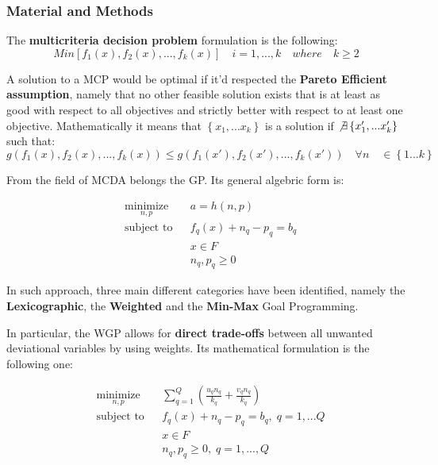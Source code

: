 \documentclass{beamer}
\begin{document}
\begin{frame}[allowframebreaks]
	\frametitle{Material and Methods}
	\justifying
The \textbf{multicriteria decision problem} formulation is the following: 
$$
Min[f_1(x),f_2(x),...,f_k(x)] \quad i=1,...,k \quad where \quad k\geq2
$$
	

A solution to a MCP would be optimal if it'd respected the \textbf{Pareto Efficient assumption}, namely that no other feasible solution exists that is at least as good with respect to all objectives and strictly better with respect to at least one objective. Mathematically it means that $\left\{x_1,...x_k\right\}$ is a solution if $\not\exists \left\{x'_1,...x'_k\right\}$
such that:
$$
	g(f_1(x),f_2(x),...,f_k(x)) \leq g(f_1(x'),f_2(x'),...,f_k(x')) \quad \forall n \quad \in  \left\{1...k\right\}
$$

\pagebreak

From the field of MCDA belongs the GP. Its general algebric form is:

\begin{equation*}
\begin{aligned}
& \underset{n,p}{\text{minimize}}
& & a=h(n,p) \\
& \text{subject to}
& & f_q(x)+n_q-p_q=b_q \\
& & & x\in F \\
& & & n_q,p_q\geq 0 
\end{aligned}
\end{equation*}

In such approach, three main different categories have been identified, namely the \textbf{Lexicographic}, the \textbf{Weighted} and the \textbf{Min-Max} Goal Programming.

\pagebreak

In particular, the WGP allows for \textbf{direct trade-offs} between all unwanted deviational variables by using weights. Its mathematical formulation is the following one:

\begin{equation*}
\begin{aligned}
& \underset{n,p}{\text{minimize}}
& & \sum_{q=1}^{Q}(\frac{u_q n_q}{k_q}+\frac{v_q n_q}{k_q}) \\
& \text{subject to}
& & f_q(x)+n_q-p_q=b_q, \; q=1,...Q \\
& & & x\in F \\
& & & n_q,p_q\geq 0, \; q=1,...,Q 
\end{aligned}
\end{equation*}



\end{frame}
\end{document}

